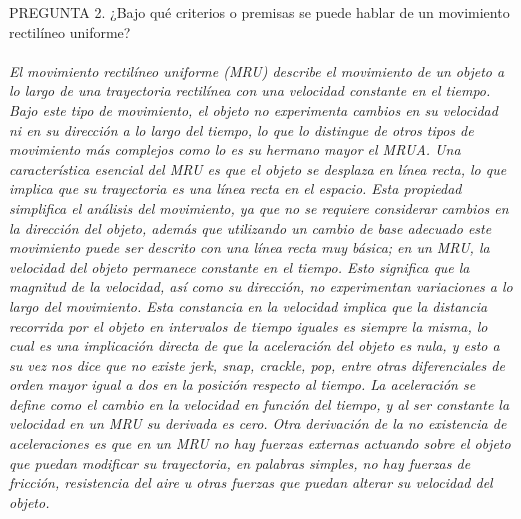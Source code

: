 \documentclass{article}
\begin{document}
PREGUNTA 2. ¿Bajo qué criterios o premisas se puede hablar de un movimiento rectilíneo uniforme?\\\\
\textit{El movimiento rectilíneo uniforme (MRU) describe el movimiento de un objeto a lo largo de una trayectoria rectilínea con una velocidad constante en el tiempo. Bajo este tipo de movimiento, el objeto no experimenta cambios en su velocidad ni en su dirección a lo largo del tiempo, lo que lo distingue de otros tipos de movimiento más complejos como lo es su hermano mayor el MRUA. Una característica esencial del MRU es que el objeto se desplaza en línea recta, lo que implica que su trayectoria es una línea recta en el espacio. Esta propiedad simplifica el análisis del movimiento, ya que no se requiere considerar cambios en la dirección del objeto, además que utilizando un cambio de base adecuado este movimiento puede ser descrito con una línea recta muy básica; en un MRU, la velocidad del objeto permanece constante en el tiempo. Esto significa que la magnitud de la velocidad, así como su dirección, no experimentan variaciones a lo largo del movimiento. Esta constancia en la velocidad implica que la distancia recorrida por el objeto en intervalos de tiempo iguales es siempre la misma, lo cual es una implicación directa de que la aceleración del objeto es nula, y esto a su vez nos dice que no existe jerk, snap, crackle, pop, entre otras diferenciales de orden mayor igual a dos en la posición respecto al tiempo. La aceleración se define como el cambio en la velocidad en función del tiempo, y al ser constante la velocidad en un MRU su derivada es cero. Otra derivación de la no existencia de aceleraciones es que en un MRU no hay fuerzas externas actuando sobre el objeto que puedan modificar su trayectoria, en palabras simples, no hay fuerzas de fricción, resistencia del aire u otras fuerzas que puedan alterar su velocidad del objeto.}
\\\\
\end{document}
